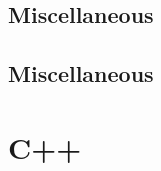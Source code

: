 \vspace{0.1\baselineskip}\subsection{Miscellaneous}
\raggedbottom
\vspace{-.7\baselineskip}\hrulefill
\vspace{0.1\baselineskip}\subsection{Miscellaneous}
\raggedbottom
\vspace{-.7\baselineskip}\hrulefill
\vspace{0.1\baselineskip}
\section{C++}
